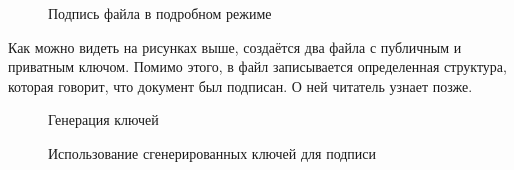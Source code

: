 \begin{figure}[h!]
  \caption{Подпись файла в подробном режиме}
\end{figure}

Как можно видеть на рисунках выше, создаётся два файла с публичным и приватным ключом. Помимо этого, в файл записывается определенная структура, которая говорит, что документ был подписан. О ней читатель узнает позже.

\begin{figure}[h!]
  \caption{Генерация ключей}
\end{figure}

\begin{figure}[h!]
  \caption{Использование сгенерированных ключей для подписи}
\end{figure}

